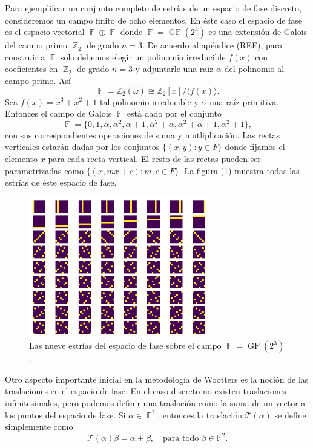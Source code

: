 \documentclass[a4paper]{report}
\DeclareMathOperator{\Z}{\mathbb{Z}}
\DeclareMathOperator{\F}{\mathbb{F}}
\DeclareMathOperator{\GF}{GF}
\begin{document}
  Para ejemplifcar un conjunto completo de estrías de un
  espacio de fase discreto, consideremos un campo finito de
  ocho elementos. En éste caso el espacio de fase es el
  espacio vectorial $\F \oplus \F$ donde $\F =
  \GF\left(2^3\right)$ es una extensión de Galois del campo
  primo $\Z_2$ de grado $n = 3$. De acuerdo al apéndice
  (REF), para construir a $\F$ solo debemos elegir un
  polinomio irreducible $f(x)$ con coeficientes en $\Z_2$ de
  grado $n = 3$ y adjuntarle una raíz $\alpha$ del polinomio
  al campo primo. Así
  \[
    \F
    = \mathbb Z_2(\omega)
    \cong \mathbb Z_2[x] / \langle f(x) \rangle.
  \] 
  Sea $f(x) = x^3+x^2+1$ tal polinomio irreducible y
  $\alpha$ una raíz primitiva. Entonces el campo de Galois
  $\F$ está dado por el conjunto 
  \[
    \F = \{
      0, 1, \alpha, \alpha^2, \alpha+1, \alpha^2+\alpha,
      \alpha^2 + \alpha + 1, \alpha^2 + 1
    \},
  \] 
  con sus correspondientes operaciones de suma y
  mutliplicación. Las rectas verticales estarán dadas por
  los conjuntos $\{(x,y) : y \in F\}$ donde fijamos el
  elemento $x$ para cada recta vertical. El resto de las
  rectas pueden ser parametrizadas como $\{(x,mx+c) : m, c
  \in F\}$. La figura (\ref{fig:GF-2-3}) muestra todas las
  estrías de éste espacio de fase.

  \begin{figure}[ht]
    \centering
    \includegraphics[width=0.7\textwidth]{imgs/GF23.png}
    \caption{Las nueve estrías del espacio de fase sobre el
      campo $\F = \GF\left(2^3\right)$.}
    \label{fig:GF-2-3}
  \end{figure}

  Otro aspecto importante inicial en la metodología de
  Wootters es la noción de las traslaciones en el espacio de
  fase. En el caso discreto no existen traslaciones
  infinitesimales, pero podemos definir una traslación como
  la suma de un vector a los puntos del espacio de fase. Si
  $\alpha \in \F^2$, entonces la traslación $\mathcal
  T(\alpha)$ se define simplemente como
  \begin{equation}
    \mathcal T(\alpha) \beta = \alpha + \beta,
    \quad
    \text{para todo } \beta \in \mathbb F^2.
  \end{equation} 
\end{document}
